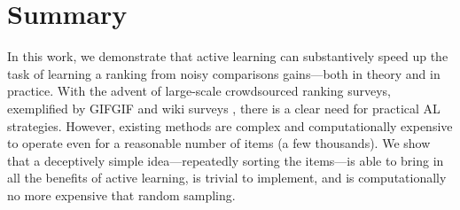 \section{Summary}  %
\label{rs:sec:summary}

In this work, we demonstrate that active learning can substantively speed up the task of learning a ranking from noisy comparisons gains---both in theory and in practice.
With the advent of large-scale crowdsourced ranking surveys, exemplified by GIFGIF and wiki surveys \citep{salganik2015wiki}, there is a clear need for practical AL strategies.
However, existing methods are complex and computationally expensive to operate even for a reasonable number of items (a few thousands).
We show that a deceptively simple idea---repeatedly sorting the items---is able to bring in all the benefits of active learning, is trivial to implement, and is computationally no more expensive that random sampling.
